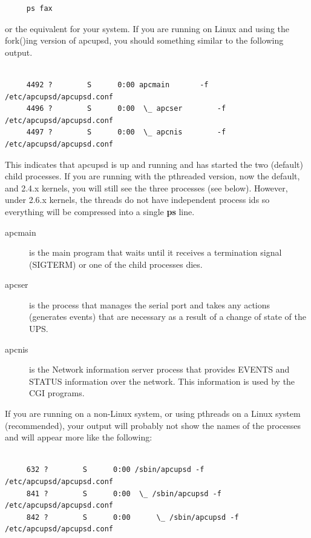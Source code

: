 {\begin{verbatim}
     ps fax
\end{verbatim}
\normalsize

or the equivalent for your system. If you are running on Linux and using the
fork()ing version of apcupsd, you should something similar to the following
output. 

\footnotesize
\begin{verbatim}
     
     4492 ?        S      0:00 apcmain       -f /etc/apcupsd/apcupsd.conf
     4496 ?        S      0:00  \_ apcser        -f /etc/apcupsd/apcupsd.conf
     4497 ?        S      0:00  \_ apcnis        -f /etc/apcupsd/apcupsd.conf
\end{verbatim}
\normalsize

This indicates that apcupsd is up and running and has started the two
(default) child processes. If you are running with the pthreaded version, now
the default, and 2.4.x kernels, you will still see the three processes (see
below).  However, under 2.6.x kernels, the threads do not have independent
process ids so everything will be compressed into a single {\bf ps} line.  

\begin{description}

\item [apcmain]
   is the main program that waits until it receives a termination signal
(SIGTERM) or one of the child processes dies.  

\item [apcser]
   is the process that manages the serial port and takes any actions (generates
events) that are necessary as a result of a change of state of the UPS.  

\item [apcnis]
   is the Network information server process that provides EVENTS and STATUS
information over the network. This information is used by the CGI programs. 
\end{description}

If you are running on a non-Linux system, or using pthreads on a Linux system
(recommended), your output will probably not show the names of the processes
and will appear more like the following: 

\footnotesize
\begin{verbatim}
     
     632 ?        S      0:00 /sbin/apcupsd -f /etc/apcupsd/apcupsd.conf
     841 ?        S      0:00  \_ /sbin/apcupsd -f /etc/apcupsd/apcupsd.conf
     842 ?        S      0:00      \_ /sbin/apcupsd -f /etc/apcupsd/apcupsd.conf
\end{verbatim}
\normalsize

}
